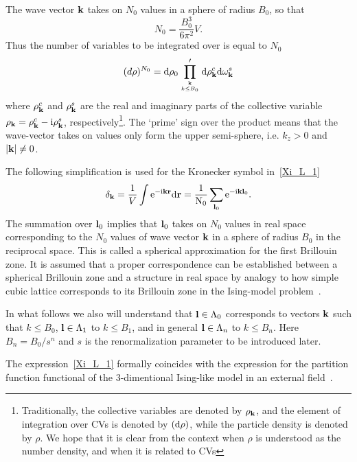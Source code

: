 The wave vector $\vb k$ takes on $N_0$ values in a sphere of radius $B_0$, so that
\begin{equation}
	\label{def:NB}
	N_0 = \frac{B_0^3}{6\pi^2}V.
\end{equation}
Thus the number of variables to be integrated over is equal to $N_0$
\begin{equation*}
	(d\rho)^{N_0} = {\rm d}\rho_0 \prod_{\vb k\atop k\le B_0}' {\rm d}\rho_{\vb k}^c {\rm d}\omega_{\vb k}^s
\end{equation*}
where $\rho_{\vb k}^c$ and $\rho_{\vb k}^s$ are the real and imaginary parts of the collective variable $\rho_{\vb k} = \rho_{\vb k}^c - {\rm i} \rho_{\vb k}^s$, respectively\footnote{Traditionally, the collective variables are denoted by $\rho_{\vb k}$, and the element of integration over CVs is denoted by $({\rm d} \rho)$, while the particle density is denoted by $\rho$. We hope that it is clear from the context when $\rho$ is understood as the number density, and when it is related to CVs}. The `prime' sign over the product means that the wave-vector takes on values only form the upper semi-sphere, i.e. $k_z > 0$ and $\abs{\vb k} \neq 0$.

The following simplification is used for the Kronecker symbol in~\eqref{Xi_L_1}
\begin{equation*}
	\delta_{\vb k} = \frac{1}{V} \int \rm{e}^{-{\rm i} \vb k \vb r} \rm{d} \vb r = \frac{1}{N_0}\sum_{\vb l_0} {\rm e}^{-{\rm i} \vb k \vb l_0}.
\end{equation*}
The summation over $\vb l_0$ implies that $\vb l_0$ takes on $N_0$ values in real space corresponding to the $N_0$ values of wave vector $\vb k$ in a sphere of radius $B_0$ in the reciprocal space. This is called a spherical approximation for the first Brillouin zone. It is assumed that a proper correspondence can be established between a spherical Brillouin zone and a structure in real space by analogy to how simple cubic lattice corresponds to its Brillouin zone in the Ising-model problem~\cite{Yukh2001book}. 

In what follows we also will understand that $\vb l \in \Lambda_0$ corresponds to vectors $\vb k$ such that $k \leq B_0$, $\vb l \in \Lambda_1$ to $k \leq B_1$, and in general $\vb l \in \Lambda_n$ to $k \leq B_n$. Here $B_n = B_0/s^n$ and $s$ is the renormalization parameter to be introduced later.

The expression~\eqref{Xi_L_1} formally coincides with the expression for the partition function functional of the 3-dimentional Ising-like model in an external field~\cite{Mpk2012book,MpkRoma2012}. 


